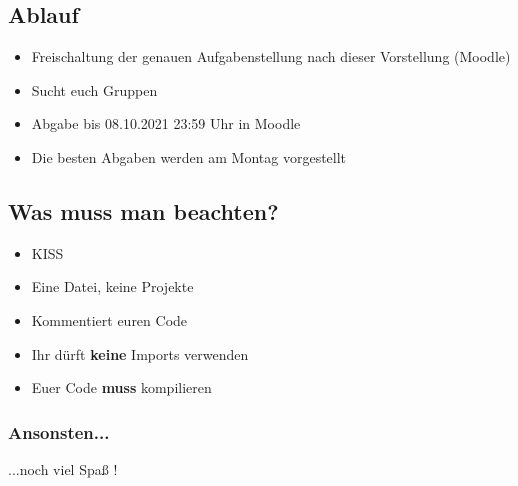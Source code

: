 \subsection{Ablauf}
\begin{frame}
	\slidehead
	\begin{itemize}
		\item Freischaltung der genauen Aufgabenstellung nach dieser Vorstellung (Moodle)
		\item Sucht euch Gruppen
		\item Abgabe bis 08.10.2021 23:59 Uhr in Moodle
		\item Die besten Abgaben werden am Montag vorgestellt
	\end{itemize}
\end{frame}

\subsection{Was muss man beachten?}
\begin{frame}
	\slidehead
	\begin{itemize}
		\item KISS
		\item Eine Datei, keine Projekte
		\item Kommentiert euren Code
		\item Ihr dürft \textbf{keine} Imports verwenden
		\item Euer Code \textbf{muss} kompilieren
	\end{itemize}
\end{frame}

\begin{frame}
	\frametitle{Ansonsten...}
	\vspace{15mm}
	\begin{center}
		\huge ...noch viel Spaß !
	\end{center}
\end{frame}
